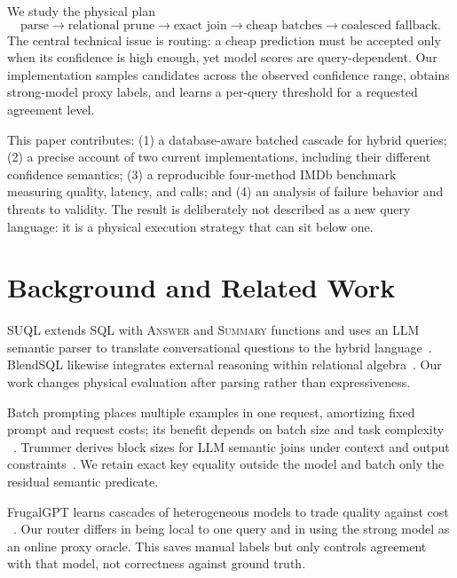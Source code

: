 \documentclass[sigconf,review]{acmart}
\begin{document}
We study the physical plan
\[
 \text{parse}\rightarrow\text{relational prune}\rightarrow\text{exact join}
 \rightarrow\text{cheap batches}\rightarrow\text{coalesced fallback}.
\]
The central technical issue is routing: a cheap prediction must be accepted only
when its confidence is high enough, yet model scores are query-dependent. Our
implementation samples candidates across the observed confidence range, obtains
strong-model proxy labels, and learns a per-query threshold for a requested
agreement level.

This paper contributes: (1) a database-aware batched cascade for hybrid queries;
(2) a precise account of two current implementations, including their different
confidence semantics; (3) a reproducible four-method IMDb benchmark measuring
quality, latency, and calls; and (4) an analysis of failure behavior and threats
to validity. The result is deliberately not described as a new query language:
it is a physical execution strategy that can sit below one.

\section{Background and Related Work}
SUQL extends SQL with \textsc{Answer} and \textsc{Summary} functions and uses an
LLM semantic parser to translate conversational questions to the hybrid
language~\cite{liu2024suql}. BlendSQL likewise integrates external reasoning
within relational algebra~\cite{glenn2024blendsql}. Our work changes physical
evaluation after parsing rather than expressiveness.

Batch prompting places multiple examples in one request, amortizing fixed prompt
and request costs; its benefit depends on batch size and task complexity
~\cite{cheng2023batch}. Trummer derives block sizes for LLM semantic joins under
context and output constraints~\cite{trummer2025semanticjoins}. We retain exact
key equality outside the model and batch only the residual semantic predicate.

FrugalGPT learns cascades of heterogeneous models to trade quality against cost
~\cite{chen2023frugalgpt}. Our router differs in being local to one query and in
using the strong model as an online proxy oracle. This saves manual labels but
only controls agreement with that model, not correctness against ground truth.
\end{document}
